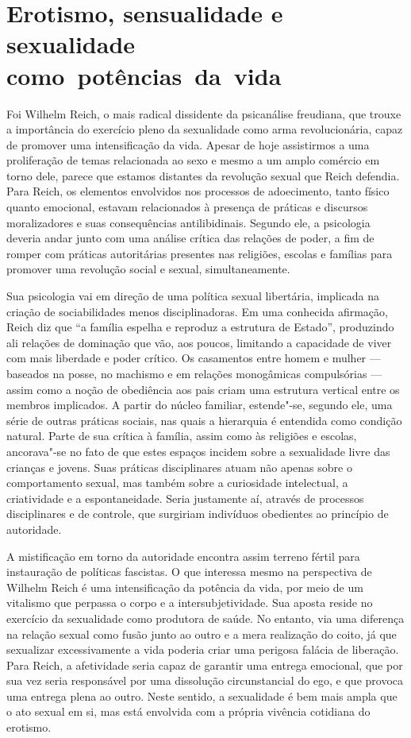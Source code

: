\section{Erotismo, sensualidade e sexualidade como~potências~da~vida}

Foi Wilhelm Reich, o mais radical dissidente da psicanálise freudiana,
que trouxe a importância do exercício pleno da sexualidade como arma
revolucionária, capaz de promover uma intensificação da vida. Apesar de
hoje assistirmos a uma proliferação de temas relacionada ao sexo e mesmo
a um amplo comércio em torno dele, parece que estamos distantes da
revolução sexual que Reich defendia. Para Reich, os elementos envolvidos
nos processos de adoecimento, tanto físico quanto emocional, estavam
relacionados à presença de práticas e discursos moralizadores e suas
consequências antilibidinais. Segundo ele, a psicologia deveria andar
junto com uma análise crítica das relações de poder, a fim de romper com
práticas autoritárias presentes nas religiões, escolas e famílias para
promover uma revolução social e sexual, simultaneamente.

Sua psicologia vai em direção de uma política sexual libertária,
implicada na criação de sociabilidades menos disciplinadoras. Em uma
conhecida afirmação, Reich diz que ``a família espelha e reproduz a
estrutura de Estado'', produzindo ali relações de dominação que vão, aos
poucos, limitando a capacidade de viver com mais liberdade e poder
crítico. Os casamentos entre homem e mulher --- baseados na posse, no
machismo e em relações monogâmicas compulsórias --- assim como a noção de
obediência aos pais criam uma estrutura vertical entre os membros
implicados. A partir do núcleo familiar, estende"-se, segundo ele, uma
série de outras práticas sociais, nas quais a hierarquia é entendida
como condição natural. Parte de sua crítica à família, assim como às
religiões e escolas, ancorava"-se no fato de que estes espaços incidem
sobre a sexualidade livre das crianças e jovens. Suas práticas
disciplinares atuam não apenas sobre o comportamento sexual, mas também
sobre a curiosidade intelectual, a criatividade e a espontaneidade.
Seria justamente aí, através de processos disciplinares e de controle,
que surgiriam indivíduos obedientes ao princípio de autoridade.

A mistificação em torno da autoridade encontra assim terreno fértil para
instauração de políticas fascistas. O que interessa mesmo na perspectiva
de Wilhelm Reich é uma intensificação da potência da vida, por meio de
um vitalismo que perpassa o corpo e a intersubjetividade. Sua aposta
reside no exercício da sexualidade como produtora de saúde. No entanto,
via uma diferença na relação sexual como fusão junto ao outro e a mera
realização do coito, já que sexualizar excessivamente a vida poderia
criar uma perigosa falácia de liberação. Para Reich, a afetividade seria
capaz de garantir uma entrega emocional, que por sua vez seria
responsável por uma dissolução circunstancial do ego, e que provoca uma
entrega plena ao outro. Neste sentido, a sexualidade é bem mais ampla
que o ato sexual em si, mas está envolvida com a própria vivência
cotidiana do erotismo.

